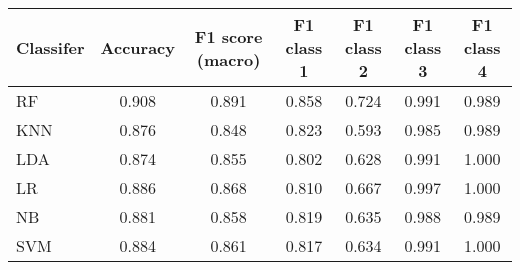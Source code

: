 \begin{tabular}{l|c|c|c|c|c|c}
\toprule
Classifer &  Accuracy &  F1 score (macro) &  F1 class 1 &  F1 class 2 &  F1 class 3 &  F1 class 4 \\
\midrule
       RF &     0.908 &             0.891 &       0.858 &       0.724 &       0.991 &       0.989 \\
      KNN &     0.876 &             0.848 &       0.823 &       0.593 &       0.985 &       0.989 \\
      LDA &     0.874 &             0.855 &       0.802 &       0.628 &       0.991 &       1.000 \\
       LR &     0.886 &             0.868 &       0.810 &       0.667 &       0.997 &       1.000 \\
       NB &     0.881 &             0.858 &       0.819 &       0.635 &       0.988 &       0.989 \\
      SVM &     0.884 &             0.861 &       0.817 &       0.634 &       0.991 &       1.000 \\
\bottomrule
\end{tabular}

